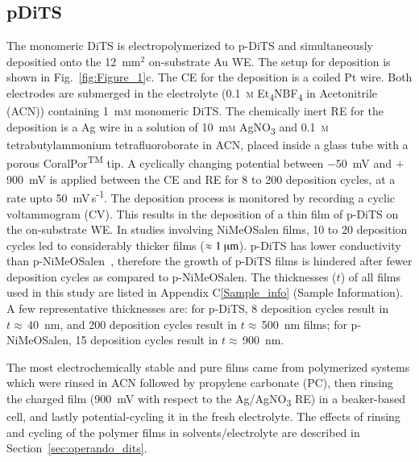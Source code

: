 \subsection{pDiTS}
The monomeric DiTS is electropolymerized to p-DiTS and simultaneously depositied onto the 12~mm$^2$ on-substrate Au WE. The setup for deposition is shown in Fig.~\ref{fig:Figure_1}c. The CE for the deposition is a coiled Pt wire. Both electrodes are submerged in the electrolyte (0.1~\textsc{m} Et\textsubscript{4}NBF\textsubscript{4} in Acetonitrile (ACN)) containing 1~m\textsc{m} monomeric DiTS. The chemically inert RE for the deposition is a Ag wire in a solution of 10~m\textsc{m} AgNO\textsubscript{3} and 0.1~\textsc{m} tetrabutylammonium tetrafluoroborate in ACN, placed inside a glass tube with a porous CoralPor\textsuperscript{TM} tip. A cyclically changing potential between $-$50~mV and $+$900~mV is applied between the CE and RE for 8 to 200 deposition cycles, at a rate upto 50~mV\,s\textsuperscript{-1}. The deposition process is monitored by recording a cyclic voltammogram (CV). This results in the deposition of a thin film of p-DiTS on the on-substrate WE. In studies involving NiMeOSalen films, 10 to 20 deposition cycles led to considerably thicker films ($\approx 1~\muup \textrm{m}$). p-DiTS has lower conductivity than p-NiMeOSalen~\cite{vereshchagin2020}, therefore the growth of p-DiTS films is hindered after fewer deposition cycles as compared to p-NiMeOSalen. The thicknesses ($t$) of all films used in this study are listed in Appendix C\ref{Sample_info} (Sample Information). A few representative thicknesses are: for p-DiTS, 8 deposition cycles result in $t\approx\,$40~nm, and 200 deposition cycles result in $t\approx\,$500~nm films; for p-NiMeOSalen, 15 deposition cycles result in $t\approx\,$900~nm.
\par


The most electrochemically stable and pure films came from polymerized systems which were rinsed in ACN followed by propylene carbonate (PC), then rinsing the charged film (900~mV with respect to the Ag/AgNO\textsubscript{3} RE) in a beaker-based cell, and lastly potential-cycling it in the fresh electrolyte. The effects of rinsing and cycling of the polymer films in solvents/electrolyte are described in Section~\ref{sec:operando_dits}.





